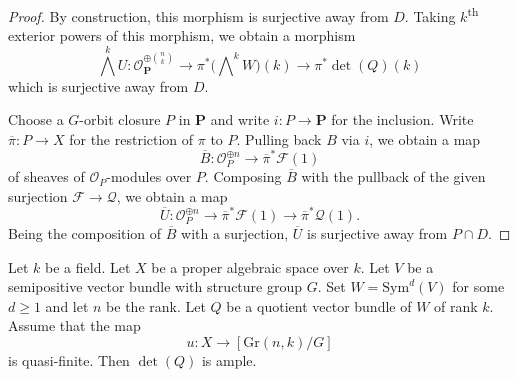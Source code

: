 \begin{proof}
By construction, this morphism is surjective away from $D$.
Taking $k$\textsuperscript{th} exterior powers of this morphism, we obtain a
morphism
$$
  \bigwedge^k U : \mathcal{O}_{\mathbf{P}}^{\oplus \binom{n}{k}} \to
    \pi^*\big(\bigwedge\nolimits^k W\big)(k) \to
    \pi^*\det(Q)(k)
$$
which is surjective away from $D$.

Choose a $G$-orbit closure $P$ in $\mathbf{P}$ and write $i : P \to \mathbf{P}$
for the inclusion.
Write $\overline{\pi} : P \to X$ for the restriction of $\pi$ to $P$.
Pulling back $B$ via $i$, we obtain a map
$$
  \overline{B} : \mathcal{O}_P^{\oplus n} \to \overline{\pi}^* \mathcal{F}(1)
$$
of sheaves of $\mathcal{O}_P$-modules over $P$.
Composing $\overline{B}$ with the pullback of the given surjection
$\mathcal{F} \to \mathcal{Q}$, we obtain a map
$$
  \overline{U} : \mathcal{O}_P^{\oplus n} \to
                  \overline{\pi}^*\mathcal{F}(1) \to
                  \overline{\pi}^*\mathcal{Q}(1).
$$
Being the composition of $\overline{B}$ with a surjection, $\overline{U}$ is
surjective away from $P \cap D$.
\end{proof}

\begin{lemma}
Let $k$ be a field.
Let $X$ be a proper algebraic space over $k$.
Let $V$ be a semipositive vector bundle with structure group $G$.
Set $W = \mathrm{Sym}^d(V)$ for some $d \geq 1$ and let $n$ be the rank.
Let $Q$ be a quotient vector bundle of $W$ of rank $k$.
Assume that the map
$$
u : X \to [\mathrm{Gr}(n,k)/G]
$$
is quasi-finite.
Then $\det(Q)$ is ample.
\end{lemma}

